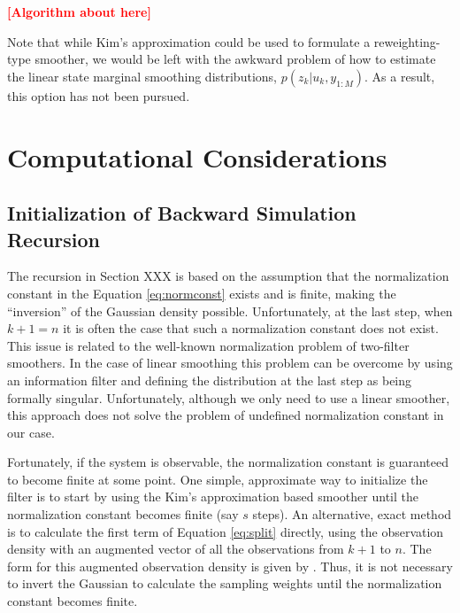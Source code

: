 \documentclass[twocolumn]{autart}    %
\newcommand{\comment}[1]{\textcolor{red}{\textbf{[#1]}}}
\begin{document}
\comment{Algorithm about here}

Note that while Kim's approximation could be used to formulate a reweighting-type smoother, we would be left with the awkward problem of how to estimate the linear state marginal smoothing distributions, $p(z_k | u_k, y_{1:M})$. As a result, this option has not been pursued.

%
%


\section{Computational Considerations}

\subsection{Initialization of Backward Simulation Recursion}
%
The recursion in Section XXX is based on the assumption that
the normalization constant in the Equation \eqref{eq:normconst} exists
and is finite, making the ``inversion'' of the Gaussian density
possible.  Unfortunately, at the last step, when $k+1 = n$ it is often
the case that such a normalization constant does not exist. This
issue is related to the well-known normalization problem of
two-filter smoothers. In the case of linear smoothing this
problem can be overcome by using an information filter and defining
the distribution at the last step as being formally singular.
Unfortunately, although we only need to use a linear smoother, this
approach does not solve the problem of undefined normalization
constant in our case.

Fortunately, if the system is observable, the normalization constant
is guaranteed to become finite at some point. One simple, approximate
way to initialize the filter is to start by using the Kim's approximation
based smoother until the normalization constant becomes finite (say
$s$ steps). An alternative, exact method is to calculate
the first term of Equation \eqref{eq:split} directly, using the
observation density with an augmented vector of all the observations
from $k+1$ to $n$. The form for this augmented observation density is
given by \cite{Kitagawa:1994}. Thus, it is not necessary to invert
the Gaussian to calculate the sampling weights until the normalization
constant becomes finite.
\end{document}
